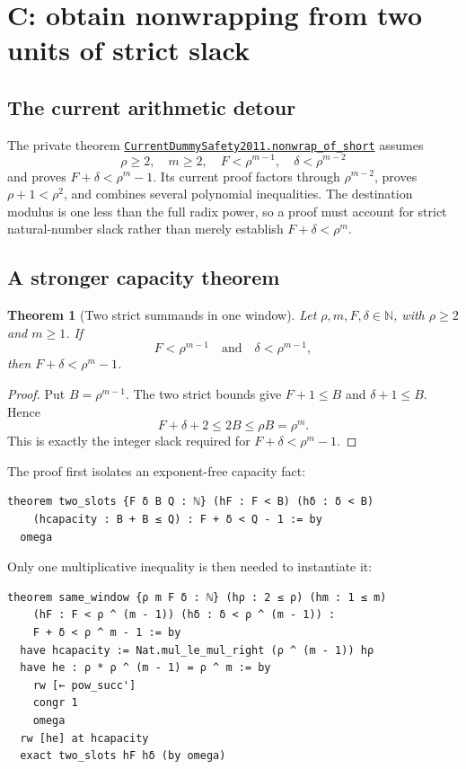 \documentclass[11pt,letterpaper]{article}
\newcommand{\code}[1]{\nolinkurl{#1}}
\newcommand{\src}[2]{\href{https://github.com/VladimirReshetnikov/ProveIt/blob/9d9d1123b39927d30363f1dcd53c23f0575c30ee/Computability/DiophantineConsistency/Lean/DiophantineConsistency/#1.lean}{\code{#2}}}
\newtheorem{theorem}{Theorem}[section]
\begin{document}
\section{C: obtain nonwrapping from two units of strict slack}

\subsection{The current arithmetic detour}

The private theorem \src{CurrentDummySafety2011}{CurrentDummySafety2011.nonwrap_of_short} assumes
\[
 \rho\ge2,\quad m\ge2,\quad
 F<\rho^{m-1},\quad \delta<\rho^{m-2}
\]
and proves $F+\delta<\rho^m-1$. Its current proof factors through $\rho^{m-2}$, proves $\rho+1<\rho^2$, and combines several polynomial inequalities. The destination modulus is one less than the full radix power, so a proof must account for strict natural-number slack rather than merely establish $F+\delta<\rho^m$.

\subsection{A stronger capacity theorem}

\begin{theorem}[Two strict summands in one window]
Let $\rho,m,F,\delta\in\mathbb N$, with $\rho\ge2$ and $m\ge1$. If
\[
 F<\rho^{m-1}\quad\text{and}\quad\delta<\rho^{m-1},
\]
then $F+\delta<\rho^m-1$.
\end{theorem}
\begin{proof}
Put $B=\rho^{m-1}$. The two strict bounds give $F+1\le B$ and $\delta+1\le B$. Hence
\[
 F+\delta+2\le2B\le\rho B=\rho^m.
\]
This is exactly the integer slack required for $F+\delta<\rho^m-1$.
\end{proof}

The proof first isolates an exponent-free capacity fact:
\begin{lstlisting}
theorem two_slots {F δ B Q : ℕ} (hF : F < B) (hδ : δ < B)
    (hcapacity : B + B ≤ Q) : F + δ < Q - 1 := by
  omega
\end{lstlisting}
Only one multiplicative inequality is then needed to instantiate it:
\begin{lstlisting}
theorem same_window {ρ m F δ : ℕ} (hρ : 2 ≤ ρ) (hm : 1 ≤ m)
    (hF : F < ρ ^ (m - 1)) (hδ : δ < ρ ^ (m - 1)) :
    F + δ < ρ ^ m - 1 := by
  have hcapacity := Nat.mul_le_mul_right (ρ ^ (m - 1)) hρ
  have he : ρ * ρ ^ (m - 1) = ρ ^ m := by
    rw [← pow_succ']
    congr 1
    omega
  rw [he] at hcapacity
  exact two_slots hF hδ (by omega)
\end{lstlisting}
\end{document}
